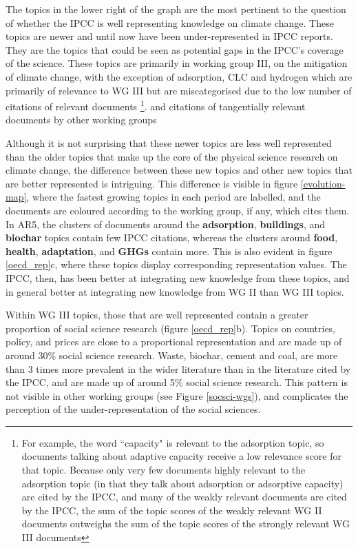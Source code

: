 \documentclass{article}
\begin{document}
\begin{linenumbers}
The topics in the lower right of the graph are the most pertinent to the question of whether the IPCC is well representing knowledge on climate change. These topics are newer and until now have been under-represented in IPCC reports. They are the topics that could be seen as potential gaps in the IPCC's coverage of the science. These topics are primarily in working group III, on the mitigation of climate change, with the exception of adsorption, CLC and hydrogen which are primarily of relevance to WG III but are miscategorised due to the low number of citations of relevant documents \footnote{For example, the word ``capacity" is relevant to the adsorption topic, so documents talking about adaptive capacity receive a low relevance score for that topic. Because only very few documents highly relevant to the adsorption topic (in that they talk about adsorption or adsorptive capacity) are cited by the IPCC, and many of the weakly relevant documents are cited by the IPCC, the sum of the topic scores of the weakly relevant WG II documents outweighs the sum of the topic scores of the strongly relevant WG III documents}. and citations of tangentially relevant documents by other working groups

Although it is not surprising that these newer topics are less well represented than the older topics that make up the core of the physical science research on climate change, the difference between these new topics and other new topics that are better represented is intriguing. This difference is visible in figure \ref{evolution-map}, where the fastest growing topics in each period are labelled, and the documents are coloured according to the working group, if any, which cites them. In AR5, the clusters of documents around the \textbf{adsorption}, \textbf{buildings}, and \textbf{biochar} topics contain few IPCC citations, whereas the clusters around \textbf{food}, \textbf{health}, \textbf{adaptation}, and \textbf{GHGs} contain more. This is also evident in figure \ref{oecd_rep}c, where these topics display corresponding representation values. The IPCC, then, has been better at integrating new knowledge from these topics, and in general better at integrating new knowledge from WG II  than WG III topics.

Within WG III topics, those that are well represented contain a greater proportion of social science research (figure \ref{oecd_rep}b). Topics on countries, policy, and prices are close to a proportional representation and are made up of around 30\% social science research. Waste, biochar, cement and coal, are more than 3 times more prevalent in the wider literature than in the literature cited by the IPCC, and are made up of around 5\% social science research. This pattern is not visible in other working groups (see Figure \ref{socsci-wgs}), and complicates the perception of the under-representation of the social sciences.



\end{linenumbers}
\end{document}
